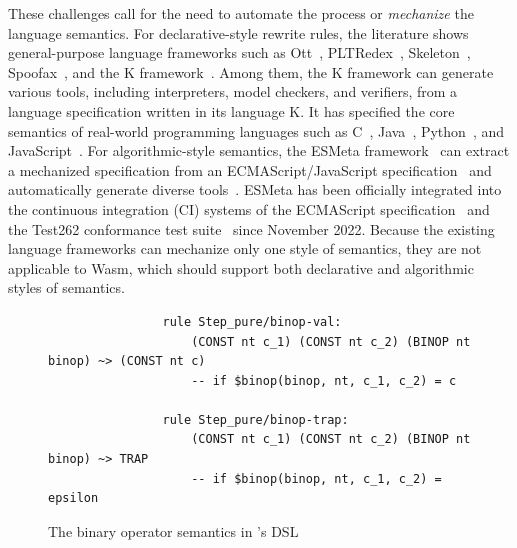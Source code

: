 These challenges call for the need to automate the process or \textit{mechanize} the language semantics.
For declarative-style rewrite rules, the literature shows general-purpose language frameworks such as
Ott~\cite{ott}, PLTRedex~\cite{pltredex}, Skeleton~\cite{skeleton}, Spoofax~\cite{spoofax},
and the K framework~\cite{k}. Among them, the K framework can generate various tools,
including interpreters, model checkers, and verifiers, from a language specification written in its language K.
It has specified the core semantics of real-world programming languages
such as C~\cite{kc}, Java~\cite{kjava}, Python~\cite{kpython}, and JavaScript~\cite{kjs}.
For algorithmic-style semantics, the ESMeta framework~\cite{esmeta}
can extract a mechanized specification from
an ECMAScript/JavaScript specification~\cite{ecmascript} and automatically
generate diverse tools~\cite{jiset,jest,jstar,jsaver}.
%
%
%
ESMeta has been officially integrated into the continuous integration (CI) systems of
the ECMAScript specification~\cite{ciecma262} and the Test262 conformance test suite~\cite{citest262}
since November 2022.
Because the existing language frameworks can mechanize only one style of semantics,
they are not applicable to Wasm, which should support both declarative and algorithmic styles of semantics.

\begin{figure}[t]
\footnotesize
\begin{verbatim}
                rule Step_pure/binop-val:
                    (CONST nt c_1) (CONST nt c_2) (BINOP nt binop) ~> (CONST nt c)
                    -- if $binop(binop, nt, c_1, c_2) = c

                rule Step_pure/binop-trap:
                    (CONST nt c_1) (CONST nt c_2) (BINOP nt binop) ~> TRAP
                    -- if $binop(binop, nt, c_1, c_2) = epsilon
\end{verbatim}
\caption{The binary operator semantics in \spectec's DSL}
\label{fig:dsl}
\end{figure}

